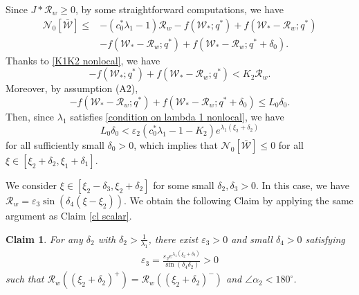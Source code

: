 \documentclass[11pt,a4paper]{article}
\newtheorem{claim}[theorem]{\textbf{Claim}}
\numberwithin{equation}{section}
\numberwithin{figure}{section}
\newcommand\bea{\begin{eqnarray}}
\newcommand\eea{\end{eqnarray}}
\begin{document}
Since $J\ast \mathcal{R}_w\ge 0$, by some  straightforward computations, we have
\begin{equation*}
\begin{aligned}
\mathcal{N}_0[\bar{\mathcal{W}}]
\le&-(c_0^*\lambda_1-1)\mathcal{R}_w-f(\mathcal{W}_*;q^*)+f(\mathcal{W}_*-\mathcal{R}_w;q^*)\\
&-f(\mathcal{W}_*-\mathcal{R}_w;q^*)+f(\mathcal{W}_*-\mathcal{R}_w;q^*+\delta_0).
\end{aligned}
\end{equation*}
Thanks to \eqref{K1K2 nonlocal}, we have
$$-f(\mathcal{W}_*;q^*)+f(\mathcal{W}_*-\mathcal{R}_w;q^*)< K_2\mathcal{R}_w.$$
Moreover, by assumption (A2), %
$$-f(\mathcal{W}_*-\mathcal{R}_w;q^*)+f(\mathcal{W}_*-\mathcal{R}_w;q^*+\delta_0)\le L_0\delta_0.$$
Then, %
since
$\lambda_1$ satisfies \eqref{condition on lambda 1 nonlocal}, we have
$$L_0\delta_0<\varepsilon_2(c_0^*\lambda_1-1-K_2) e^{\lambda_1(\xi_2+\delta_2)}$$
for all sufficiently small $\delta_0>0$,
which implies that $\mathcal{N}_0[\bar{\mathcal W}]\le 0$ for all $\xi\in[\xi_2+\delta_2,\xi_1+\delta_1]$.


\medskip


 We consider $\xi\in[\xi_2-\delta_3,\xi_2+\delta_2]$ for some small $\delta_2,\delta_3>0$. In this case, we have $\mathcal{R}_w=\varepsilon_3\sin(\delta_4(\xi-\xi_2))$.
We obtain the following Claim by applying the same argument as Claim \ref{cl scalar}.
\begin{claim}\label{cl scalar nonlocal}
For any $\delta_2$ with $\delta_2>\frac{1}{\lambda_1}$, there exist
$\varepsilon_3>0$ and small $\delta_4>0$ satisfying
\bea\label{epsilon 3 nonlocal}
\varepsilon_3= \frac{\varepsilon_2e^{\lambda_1(\xi_2+\delta_2)}}{\sin(\delta_4\delta_2)}>0
\eea
such that $\mathcal{R}_w((\xi_2+\delta_2)^+)=\mathcal{R}_w((\xi_2+\delta_2)^-)$ and $\angle\alpha_2<180^{\circ}$.
\end{claim}
\end{document}

